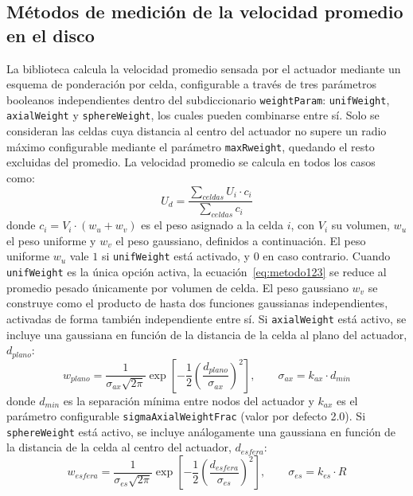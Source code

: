 \subsection{Métodos de medición de la velocidad promedio en el disco}
La biblioteca calcula la velocidad promedio sensada por el actuador mediante un esquema de ponderación por celda, configurable a través de tres parámetros booleanos independientes dentro del subdiccionario \texttt{weightParam}: \texttt{unifWeight}, \texttt{axialWeight} y \texttt{sphereWeight}, los cuales pueden combinarse entre sí. Solo se consideran las celdas cuya distancia al centro del actuador no supere un radio máximo configurable mediante el parámetro \texttt{maxRweight}, quedando el resto excluidas del promedio.
La velocidad promedio se calcula en todos los casos como:
\begin{equation}
U_d = \frac{\sum_{celdas} U_i \cdot c_i}{\sum_{celdas} c_i}
\label{eq:metodo123}
\end{equation}
donde $c_i = V_i \cdot (w_u + w_v)$ es el peso asignado a la celda $i$, con $V_i$ su volumen, $w_u$ el peso uniforme y $w_v$ el peso gaussiano, definidos a continuación.
El peso uniforme $w_u$ vale $1$ si \texttt{unifWeight} está activado, y $0$ en caso contrario. Cuando \texttt{unifWeight} es la única opción activa, la ecuación~\ref{eq:metodo123} se reduce al promedio pesado únicamente por volumen de celda.
El peso gaussiano $w_v$ se construye como el producto de hasta dos funciones gaussianas independientes, activadas de forma también independiente entre sí. Si \texttt{axialWeight} está activo, se incluye una gaussiana en función de la distancia de la celda al plano del actuador, $d_{plano}$:
\begin{equation}
w_{plano} = \frac{1}{\sigma_{ax}\sqrt{2\pi}}\exp\left[-\frac{1}{2}\left(\frac{d_{plano}}{\sigma_{ax}}\right)^2\right], \qquad \sigma_{ax} = k_{ax} \cdot d_{min}
\label{eq:gauss_axial}
\end{equation}
donde $d_{min}$ es la separación mínima entre nodos del actuador y $k_{ax}$ es el parámetro configurable \texttt{sigmaAxialWeightFrac} (valor por defecto 2.0). Si \texttt{sphereWeight} está activo, se incluye análogamente una gaussiana en función de la distancia de la celda al centro del actuador, $d_{esfera}$:
\begin{equation}
w_{esfera} = \frac{1}{\sigma_{es}\sqrt{2\pi}}\exp\left[-\frac{1}{2}\left(\frac{d_{esfera}}{\sigma_{es}}\right)^2\right], \qquad \sigma_{es} = k_{es} \cdot R
\label{eq:gauss_esfera}
\end{equation}

